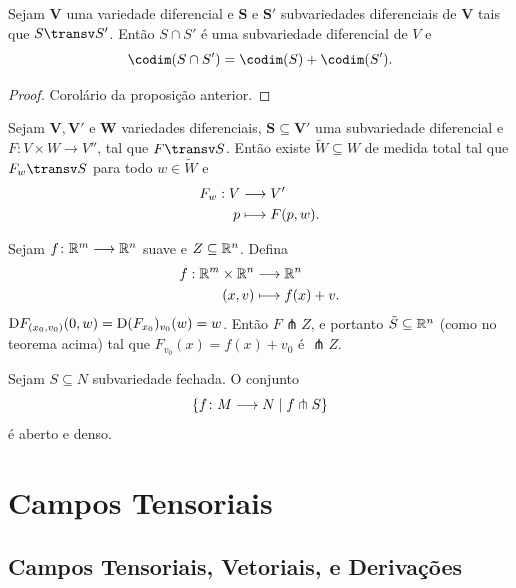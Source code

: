 \begin{prop}
Sejam $\bm V$ uma variedade diferencial e $\bm S$ e $\bm S'$ subvariedades diferenciais de $\bm V$ tais que $S \transv S'$. Então $S \cap S'$ é uma subvariedade diferencial de $V$ e
	\begin{equation*}
	\codim(S \cap S') = \codim(S) + \codim(S').
	\end{equation*}
\end{prop}
\begin{proof}
Corolário da proposição anterior.
\end{proof}


\begin{prop}
Sejam $\bm V,\bm V'$ e $\bm W$ variedades diferenciais, $\bm S \subseteq \bm V'$ uma subvariedade diferencial e $F\colon V \times W \to V''$, tal que $F \transv S$. Então existe $\tilde{W} \subseteq W$ de medida total tal que $F_w \transv S$ para todo $w \in \tilde{W}$ e
	\begin{align*}
	{F_w}: {V} &\longrightarrow {V'} \\{p} &\longmapsto {F(p,w)}.
	\end{align*}
\end{prop}

\begin{ex}Sejam $f\colon \mathbb{R}^m \longrightarrow \mathbb{R}^n$ suave e $Z \subseteq \mathbb{R}^n$. Defina
	\begin{align*}
	{f}: {\mathbb{R}^m \times \mathbb{R}^n} &\longrightarrow {\mathbb{R}^n} \\{(x,v)} &\longmapsto {f(x)+v}.
	\end{align*}
$\mathrm{D} F_{(x_0,v_0)}(0,w)=\mathrm{D} (F_{x_0})_{v_0}(w) = w$. Então $F \pitchfork Z$, e portanto $\tilde{S}\subseteq \mathbb{R}^n$ (como no teorema acima) tal que $F_{v_0}(x)=f(x)+v_0$ é $\pitchfork Z$.
\end{ex}

\begin{prop}
Sejam $S \subseteq N$ subvariedade fechada. O conjunto
	\begin{equation*}
	\left\{f\colon M \longrightarrow N \;\middle\vert\; f \pitchfork S \right\}
	\end{equation*}
é aberto e denso.
\end{prop}











\section{Campos Tensoriais}

\subsection{Campos Tensoriais, Vetoriais, e Derivações}

